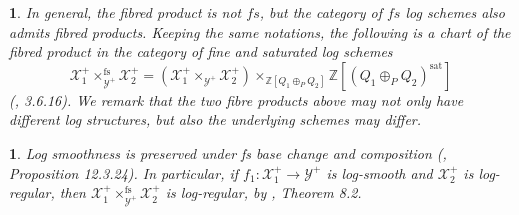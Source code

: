 \documentclass{amsart}%
\numberwithin{equation}{subsection}
\theoremstyle{plain2}
\theoremstyle{definition2}
\theoremstyle{stepstyle}
\theoremstyle{point}
\theoremstyle{subpoint}
\newtheorem{subpoint}[equation]{}%
\newcommand{\spa}[1]{\begin{subpoint}#1\end{subpoint}}           %
\newcommand{\Z}{\ensuremath{\mathbb{Z}}}
\newcommand{\cX}{\ensuremath{\mathscr{X}}}
\newcommand{\cY}{\ensuremath{\mathscr{Y}}}
\renewcommand{\cY}{\ensuremath{\mathscr{Y}}}
\begin{document}
\spa{In general, the fibred product is not $fs$, but the category of $fs$ log schemes also admits fibred products. Keeping the same notations, the following is a chart of the fibred product in the category of fine and saturated log schemes $$\cX_1^+\times_{\cY^+}^{\text{fs}} \cX_2^+ = (\cX_1^+\times_{\cY^+} \cX_2^+) \times_{\Z[Q_1 \oplus_P Q_2]} \Z[(Q_1 \oplus_P Q_2)^{\text{sat}}]$$(\cite{Bultot2015}, 3.6.16). We remark that the two fibre products above may not only have different log structures, but also the underlying schemes may differ.}

\spa{Log smoothness is preserved under fs base change and composition (\cite{GabberRamero}, Proposition 12.3.24). In particular, if $f_1: \cX_1^+ \rightarrow \cY^+$ is log-smooth and $\cX_2^+$ is log-regular, then $\cX_1^+\times^{\text{fs}}_{\cY^+} \cX_2^+$ is log-regular, by \cite{Kato1994a}, Theorem 8.2.

}
\end{document}
